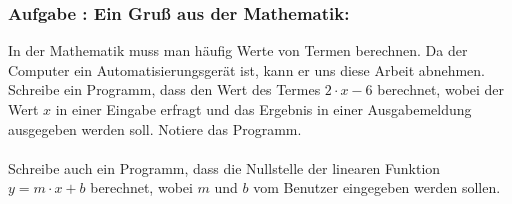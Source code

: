 \documentclass[a4paper,12pt]{article}
\newcounter{aufgnr}
\begin{document}
\subsubsection*{Aufgabe \theaufgnr: Ein Gruß aus der Mathematik:}
In der Mathematik muss man häufig Werte von Termen berechnen. Da der Computer ein Automatisierungsgerät ist, kann er uns diese Arbeit abnehmen. Schreibe ein Programm, dass den Wert des Termes $2 \cdot x - 6$ berechnet, wobei der Wert $x$ in einer Eingabe erfragt und das Ergebnis in einer Ausgabemeldung ausgegeben werden soll. Notiere das Programm.\\
\\
Schreibe auch ein Programm, dass die Nullstelle der linearen Funktion $y = m \cdot x + b$ berechnet, wobei $m$ und $b$ vom Benutzer eingegeben werden sollen.\\
\end{document}
